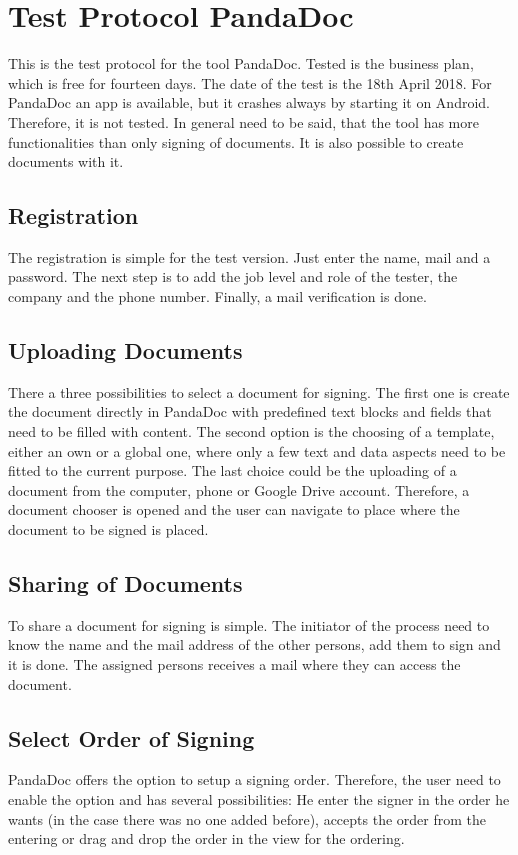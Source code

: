 \section{Test Protocol PandaDoc}
\label{sec:pandadoc}

This is the test protocol for the tool PandaDoc. Tested is the business plan, which is free for fourteen days. The date of the test is the 18th April 2018. For PandaDoc an \gls{app} is available, but it crashes always by starting it on Android. Therefore, it is not tested. In general need to be said, that the tool has more functionalities than only signing of documents. It is also possible to create documents with it.

\subsection{Registration}
The registration is simple for the test version. Just enter the name, mail and a password. The next step is to add the job level and role of the tester, the company and the phone number. Finally, a mail verification is done.

\subsection{Uploading Documents}
There a three possibilities to select a document for signing. The first one is create the document directly in PandaDoc with predefined text blocks and fields that need to be filled with content. The second option is the choosing of a template, either an own or a global one, where only a few text and data aspects need to be fitted to the current purpose. The last choice could be the uploading of a document from the computer, phone or Google Drive account. Therefore, a document chooser is opened and the user can navigate to place where the document to be signed is placed.

\subsection{Sharing of Documents}
To share a document for signing is simple. The initiator of the process need to know the name and the mail address of the other persons, add them to sign and it is done. The assigned persons receives a mail where they can access the document.

\subsection{Select Order of Signing}
PandaDoc offers the option to setup a signing order. Therefore, the user need to enable the option and has several possibilities: He enter the signer in the order he wants (in the case there was no one added before), accepts the order from the entering or drag and drop the order in the view for the ordering.

